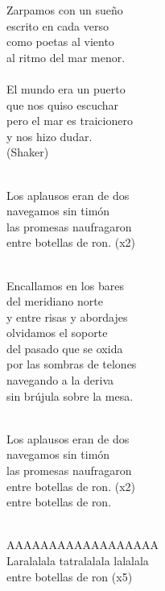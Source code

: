 \begin{cancion}[Náufragos][Náufragos]%
Zarpamos con un sueño\\
escrito en cada verso\\
como poetas al viento\\
al ritmo del mar menor.\\
	\jump\\
El mundo era un puerto\\
que nos quiso escuchar\\
pero el mar es traicionero\\
y nos hizo dudar.\\
(Shaker)\\\jump\\
	\begin{chorus}%
Los aplausos eran de dos\\
navegamos sin timón\\
las promesas naufragaron\\
entre botellas de ron. (x2)\\
	\end{chorus}%
	\jump\\
Encallamos en los bares\\
del meridiano norte\\
y entre risas y abordajes\\
olvidamos el soporte\\
del pasado que se oxida\\
por las sombras de telones\\
navegando a la deriva\\
sin brújula sobre la mesa.\\\jump\\
	\begin{chorus}%
Los aplausos eran de dos\\
navegamos sin timón\\
las promesas naufragaron\\
entre botellas de ron. (x2)\\
entre botellas de ron.\\
	\end{chorus}%
	\jump\\
AAAAAAAAAAAAAAAAAA\\
Laralalala tatralalala lalalala\\
entre botellas de ron (x5)\\
\end{cancion}%
